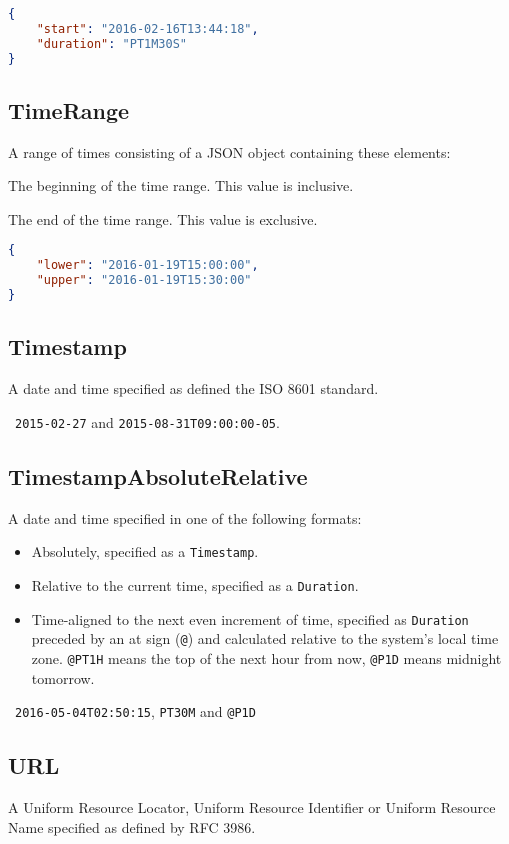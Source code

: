 \documentclass[10pt]{article}
\begin{document}
\example
\begin{lstlisting}[language=json]
{
    "start": "2016-02-16T13:44:18",
    "duration": "PT1M30S"
}
\end{lstlisting}


\subsection{TimeRange}
A range of times consisting of a JSON object containing these
elements:

 The beginning of the time range.  This
value is inclusive.

 The end of the time range.  This
value is exclusive.

\example
\begin{lstlisting}[language=json]
{
    "lower": "2016-01-19T15:00:00",
    "upper": "2016-01-19T15:30:00"
}
\end{lstlisting}


\subsection{Timestamp}
A date and time specified as defined the ISO 8601 standard.

\example\ {\tt 2015-02-27} and {\tt 2015-08-31T09:00:00-05}.



\subsection{TimestampAbsoluteRelative}
A date and time specified in one of the following formats:
\begin{itemize}
\item Absolutely, specified as a {\tt Timestamp}.
\item Relative to the current time, specified as a {\tt Duration}.
\item Time-aligned to the next even increment of time, specified as
  {\tt Duration} preceded by an at sign ({\tt @}) and calculated
  relative to the system's local time zone.  {\tt @PT1H} means the top
  of the next hour from now, {\tt @P1D} means midnight tomorrow.
\end{itemize}

\example\ {\tt 2016-05-04T02:50:15}, {\tt PT30M} and {\tt @P1D}



\subsection{URL}
A Uniform Resource Locator, Uniform Resource Identifier or Uniform
Resource Name specified as defined by RFC 3986.
\end{document}
